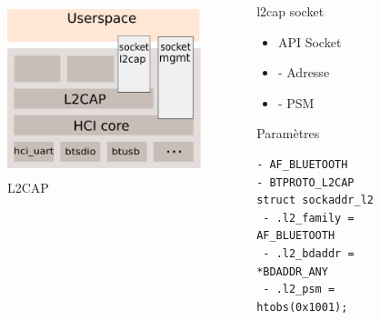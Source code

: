 \begin{frame}[fragile]
\begin{columns}[t]
\begin{column}{0.60\linewidth}
	\begin{figure}
		\includegraphics[height=5cm]{img/bluez_kernel_l2cap_sock.png}
		\caption{L2CAP}
	\end{figure}
\end{column}
\begin{column}{0.40\linewidth}
	\begin{block}{l2cap socket}
		\begin{itemize}
			\item API Socket
			\item - Adresse
			\item - PSM 
		\end{itemize}
	\end{block}
	\begin{block}{Paramètres}
		\begin{Verbatim}[fontsize=\tiny]
- AF_BLUETOOTH
- BTPROTO_L2CAP
struct sockaddr_l2
 - .l2_family = AF_BLUETOOTH
 - .l2_bdaddr = *BDADDR_ANY
 - .l2_psm = htobs(0x1001);
		\end{Verbatim}
	\end{block}
\end{column}
\end{columns}
\end{frame}

